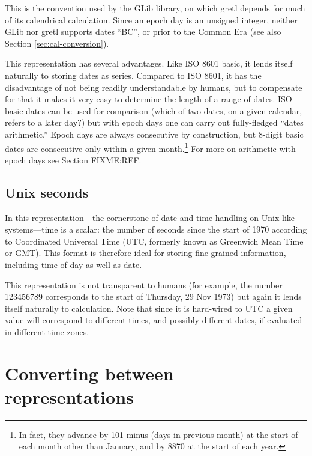 This is the convention used by the \textsf{GLib} library, on which
gretl depends for much of its calendrical calculation. Since an epoch
day is an unsigned integer, neither \textsf{GLib} nor gretl supports
dates ``BC'', or prior to the Common Era (see also Section
\ref{sec:cal-conversion}).

This representation has several advantages. Like ISO 8601 basic, it
lends itself naturally to storing dates as series. Compared to ISO
8601, it has the disadvantage of not being readily understandable by
humans, but to compensate for that it makes it very easy to determine
the length of a range of dates.  ISO basic dates can be used for
comparison (which of two dates, on a given calendar, refers to a later
day?) but with epoch days one can carry out fully-fledged ``dates
arithmetic.''  Epoch days are always consecutive by construction, but
8-digit basic dates are consecutive only within a given
month.\footnote{In fact, they advance by 101 minus (days in previous
  month) at the start of each month other than January, and by 8870 at
  the start of each year.} For more on arithmetic with epoch days see
Section FIXME:REF.

\subsection{Unix seconds}
\label{sec:cal-seconds}

In this representation---the cornerstone of date and time handling on
Unix-like systems---time is a scalar: the number of seconds since the
start of 1970 according to Coordinated Universal Time (UTC, formerly
known as Greenwich Mean Time or GMT). This format is therefore ideal
for storing fine-grained information, including time of day as well as
date.

This representation is not transparent to humans (for example, the
number 123456789 corresponds to the start of Thursday, 29 Nov 1973)
but again it lends itself naturally to calculation. Note that since
it is hard-wired to UTC a given value will correspond to different
times, and possibly different dates, if evaluated in different time
zones.

\section{Converting between representations}
\label{sec:cal-conversions}


